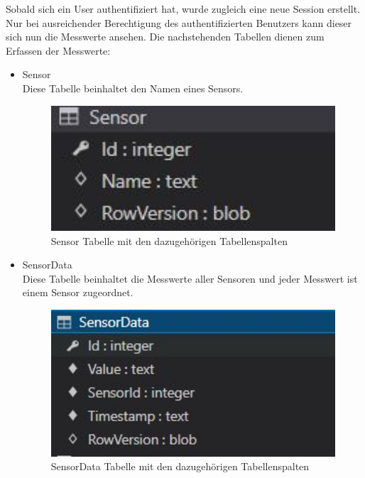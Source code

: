Sobald sich ein User authentifiziert hat, wurde zugleich eine neue Session erstellt. Nur bei ausreichender Berechtigung des authentifizierten Benutzers kann dieser sich nun die Messwerte ansehen.
Die nachstehenden Tabellen dienen zum Erfassen der Messwerte:

\begin{itemize}
    \item Sensor\\
    Diese Tabelle beinhaltet den Namen eines Sensors.
    \begin{figure}[H]
        \centering
        \includegraphics[width=1\textwidth]{pics/SensorTableStructure.JPG}
        \caption{Sensor Tabelle mit den dazugehörigen Tabellenspalten}
    \end{figure}
\end{itemize}

\begin{itemize}
    \item SensorData\\
    Diese Tabelle beinhaltet die Messwerte aller Sensoren und jeder Messwert ist einem Sensor zugeordnet.
    \begin{figure}[H]
        \centering
        \includegraphics[width=1\textwidth]{pics/SensorDataTableStructure.JPG}
        \caption{SensorData Tabelle mit den dazugehörigen Tabellenspalten}
    \end{figure}
\end{itemize}


